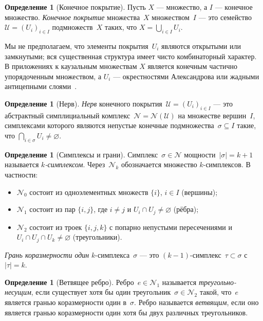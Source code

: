 \documentclass[11pt,a4paper]{article}
\theoremstyle{plain}
\theoremstyle{definition}
\newtheorem{definition}[theorem]{Определение}
\theoremstyle{remark}
\newcommand{\cU}{\mathcal{U}}
\newcommand{\cN}{\mathcal{N}}
\begin{document}
\begin{definition}[Конечное покрытие]
\label{def:cover}
Пусть $X$ --- множество, а $I$ --- конечное множество. \emph{Конечное
покрытие} множества~$X$ множеством~$I$ --- это семейство
$\cU = (U_i)_{i \in I}$ подмножеств~$X$ таких, что
$X = \bigcup_{i \in I} U_i$.
\end{definition}

Мы не предполагаем, что элементы покрытия~$U_i$ являются открытыми
или замкнутыми; вся существенная структура имеет чисто комбинаторный
характер. В приложениях к каузальным множествам $X$ является конечным
частично упорядоченным множеством, а $U_i$ --- окрестностями Александрова
или жадными антицепными слоями~\cite{Sorkin:2003bx,Major:2007}.

\begin{definition}[Нерв]
\label{def:nerve}
\emph{Нерв} конечного покрытия~$\cU = (U_i)_{i \in I}$ --- это абстрактный
симплициальный комплекс~$\cN = \cN(\cU)$ на множестве
вершин~$I$, симплексами которого являются непустые конечные
подмножества~$\sigma \subseteq I$ такие, что
$\bigcap_{i \in \sigma} U_i \neq \varnothing$.
\end{definition}

\begin{definition}[Симплексы и грани]
\label{def:simplices}
Симплекс~$\sigma \in \cN$ мощности~$|\sigma| = k + 1$ называется
\emph{$k$-симплексом}. Через~$\cN_k$ обозначается множество $k$-симплексов.
В частности:
\begin{itemize}[nosep]
  \item $\cN_0$ состоит из одноэлементных множеств $\{i\}$, $i \in I$ (вершины);
  \item $\cN_1$ состоит из пар $\{i,j\}$, где $i \neq j$ и
        $U_i \cap U_j \neq \varnothing$ (рёбра);
  \item $\cN_2$ состоит из троек $\{i,j,k\}$ с попарно непустыми
        пересечениями и $U_i \cap U_j \cap U_k \neq \varnothing$ (треугольники).
\end{itemize}
\emph{Грань коразмерности один} $k$-симплекса~$\sigma$ --- это
$(k{-}1)$-симплекс~$\tau \subset \sigma$ с $|\tau| = k$.
\end{definition}

\begin{definition}[Ветвящее ребро]
\label{def:branching}
Ребро~$e \in \cN_1$ называется \emph{треугольно-несущим}, если существует
хотя бы один треугольник~$\sigma \in \cN_2$ такой, что~$e$ является
гранью коразмерности один в~$\sigma$. Ребро называется \emph{ветвящим},
если оно является гранью коразмерности один хотя бы двух различных
треугольников.
\end{definition}
\end{document}
